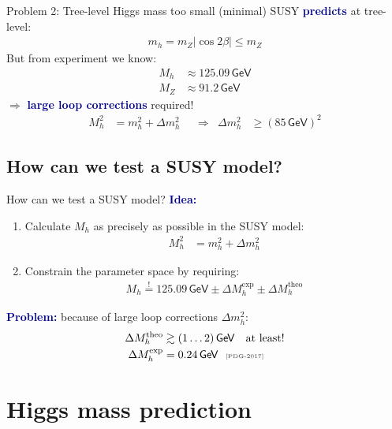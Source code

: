 \documentclass[hyperref={pdfpagelabels=false},ngerman]{beamer}
\newcommand{\eh}[1]{\,\mathsf{#1}}
\newcommand{\mycite}[1]{\ensuremath{\text{\textcolor{darkgray}{\tiny [#1]}}}}
\renewcommand{\emph}[1]{\textbf{\textcolor{darkblue}{#1}}}
\newcommand{\GeV}{\eh{GeV}}
\begin{document}
\begin{frame}{Problem 2: Tree-level Higgs mass too small}
  (minimal) SUSY \emph{predicts} at tree-level:
  \begin{align*}
    m_h = m_Z |\cos 2\beta| \le m_Z
  \end{align*}
  But from experiment we know:
  \begin{align*}
    M_h &\approx 125.09 \GeV \\
    M_Z &\approx 91.2 \GeV
  \end{align*}
  $\Rightarrow$ \emph{large loop corrections} required!
  \begin{align*}
    M_h^2 &= m_h^2 + \Delta m_h^2
    & &\Rightarrow &
    \Delta m_h^2 &\geq (85\eh{GeV})^2
  \end{align*}
\end{frame}

\subsection{How can we test a SUSY model?}

\begin{frame}{How can we test a SUSY model?}
  \emph{Idea:}
  \begin{enumerate}
  \item Calculate $M_h$ as precisely as possible in the SUSY model:
  \begin{align*}
    M_h^2 &= m_h^2 + \Delta m_h^2
  \end{align*}
  \item Constrain the parameter space by requiring:
    \begin{align*}
      M_h \overset{!}{=} 125.09 \GeV \pm \Delta M_h^{\text{exp}} \pm \Delta M_h^{\text{theo}}
    \end{align*}
  \end{enumerate}
  \emph{Problem:} because of large loop corrections $\Delta m_h^2$:
  \begin{align*}
    \Delta M_h^{\text{theo}} &\gtrsim (1\ldots 2)\eh{GeV} \quad \text{at least!} \\
    \Delta M_h^{\text{exp}} &= 0.24\eh{GeV} \ \ \mycite{PDG-2017}
  \end{align*}
\end{frame}

\section{Higgs mass prediction}
\end{document}
